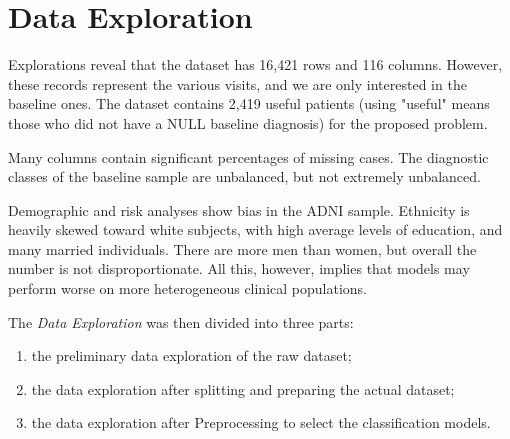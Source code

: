 \section{Data Exploration}
Explorations reveal that the dataset has 16,421 rows and 116 columns. However, these records represent the various visits, and we are only interested in the baseline ones. The dataset contains 2,419 useful patients (using "useful" means those who did not have a NULL baseline diagnosis) for the proposed problem.

Many columns contain significant percentages of missing cases. The diagnostic classes of the baseline sample are unbalanced, but not extremely unbalanced.

Demographic and risk analyses show bias in the ADNI sample. Ethnicity is heavily skewed toward white subjects, with high average levels of education, and many married individuals. There are more men than women, but overall the number is not disproportionate. All this, however, implies that models may perform worse on more heterogeneous clinical populations. 

The \textit{Data Exploration} was then divided into three parts: 
\begin{enumerate}
	\item the preliminary data exploration of the raw dataset;
	\item the data exploration after splitting and preparing the actual dataset;
	\item the data exploration after Preprocessing to select the classification models.
\end{enumerate}



